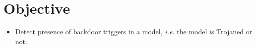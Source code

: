 \section{Objective}\label{sec:obj}
\begin{frame}{}

\begin{itemize}
    \item Detect presence of backdoor triggers in a model, \textit{i.e.} the model is Trojaned or not.
\end{itemize}

\end{frame}